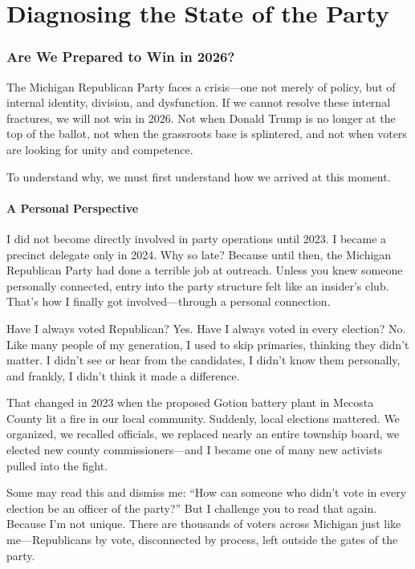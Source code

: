 \part{Diagnosing the State of the Party}

\section{Are We Prepared to Win in 2026?}

The Michigan Republican Party faces a crisis—one not merely of policy, but of internal identity, division, and dysfunction. If we cannot resolve these internal fractures, we will not win in 2026. Not when Donald Trump is no longer at the top of the ballot, not when the grassroots base is splintered, and not when voters are looking for unity and competence.

To understand why, we must first understand how we arrived at this moment.

\subsection{A Personal Perspective}

I did not become directly involved in party operations until 2023. I became a precinct delegate only in 2024. Why so late? Because until then, the Michigan Republican Party had done a terrible job at outreach. Unless you knew someone personally connected, entry into the party structure felt like an insider's club. That’s how I finally got involved—through a personal connection.

Have I always voted Republican? Yes. Have I always voted in every election? No. Like many people of my generation, I used to skip primaries, thinking they didn’t matter. I didn’t see or hear from the candidates, I didn’t know them personally, and frankly, I didn’t think it made a difference.

That changed in 2023 when the proposed Gotion battery plant in Mecosta County lit a fire in our local community. Suddenly, local elections mattered. We organized, we recalled officials, we replaced nearly an entire township board, we elected new county commissioners—and I became one of many new activists pulled into the fight.

Some may read this and dismiss me: “How can someone who didn’t vote in every election be an officer of the party?” But I challenge you to read that again. Because I’m not unique. There are thousands of voters across Michigan just like me—Republicans by vote, disconnected by process, left outside the gates of the party.

